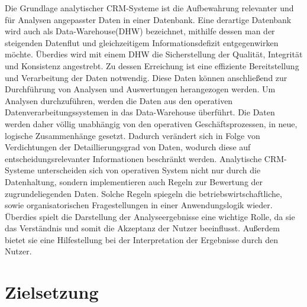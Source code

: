 Die Grundlage analytischer CRM-Systeme ist die Aufbewahrung relevanter und für Analysen angepasster Daten in einer Datenbank. Eine derartige Datenbank wird auch als Data-Warehouse(DHW) bezeichnet, mithilfe dessen man der steigenden Datenflut und gleichzeitigem Informationsdefizit entgegenwirken möchte. Überdies wird mit einem DHW die Sicherstellung der Qualität, Integrität und Konsistenz angestrebt. Zu dessen Erreichung ist eine effiziente Bereitstellung und Verarbeitung der Daten notwendig. Diese Daten können anschließend zur Durchführung von Analysen und Auswertungen herangezogen werden. Um Analysen durchzuführen, werden die Daten aus den operativen Datenverarbeitungssystemen in das Data-Warehouse überführt. 
Die Daten werden daher völlig unabhängig von den operativen Geschäftsprozessen, in neue, logische Zusammenhänge gesetzt. Dadurch verändert sich in Folge von Verdichtungen der Detaillierungsgrad von Daten, wodurch diese auf entscheidungsrelevanter Informationen beschränkt werden. Analytische CRM-Systeme unterscheiden sich von operativen System nicht nur durch die Datenhaltung, sondern implementieren auch Regeln zur Bewertung der zugrundeliegenden Daten. Solche Regeln spiegeln die betriebswirtschaftliche, sowie organisatorischen Fragestellungen in einer Anwendungslogik wieder. Überdies spielt die Darstellung der Analyseergebnisse eine wichtige Rolle, da sie das Verständnis und somit die Akzeptanz der Nutzer beeinflusst. Außerdem bietet sie eine Hilfestellung bei der Interpretation der Ergebnisse durch den Nutzer. 



\section{Zielsetzung}
\label{ch:Einfuehrung:sec:Zielsetzung}

